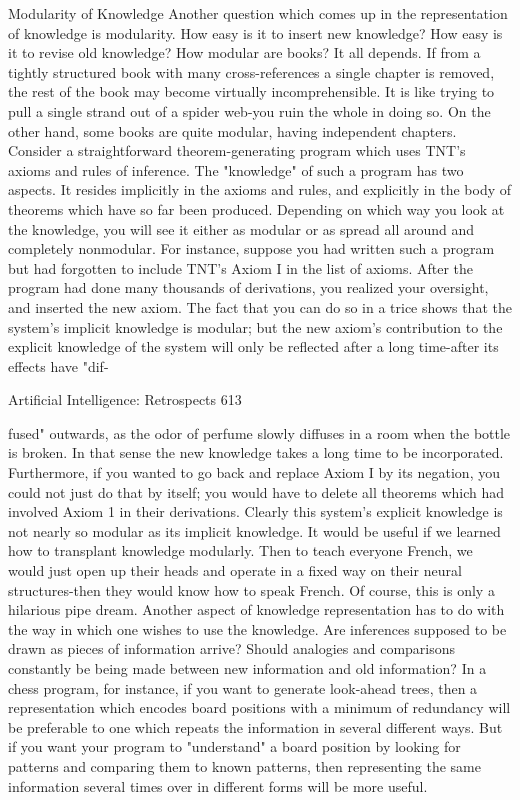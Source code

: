{                              Modularity of Knowledge
Another question which comes up in the representation of knowledge is modularity. How
easy is it to insert new knowledge? How easy is it to revise old knowledge? How modular
are books? It all depends. If from a tightly structured book with many cross-references a
single chapter is removed, the rest of the book may become virtually incomprehensible. It
is like trying to pull a single strand out of a spider web-you ruin the whole in doing so.
On the other hand, some books are quite modular, having independent chapters.
         Consider a straightforward theorem-generating program which uses TNT's
axioms and rules of inference. The "knowledge" of such a program has two aspects. It
resides implicitly in the axioms and rules, and explicitly in the body of theorems which
have so far been produced. Depending on which way you look at the knowledge, you will
see it either as modular or as spread all around and completely nonmodular. For instance,
suppose you had written such a program but had forgotten to include TNT's Axiom I in
the list of axioms. After the program had done many thousands of derivations, you
realized your oversight, and inserted the new axiom. The fact that you can do so in a trice
shows that the system's implicit knowledge is modular; but the new axiom's contribution
to the explicit knowledge of the system will only be reflected after a long time-after its
effects have "dif-




Artificial Intelligence: Retrospects                                                      613

fused" outwards, as the odor of perfume slowly diffuses in a room when the bottle is
broken. In that sense the new knowledge takes a long time to be incorporated.
Furthermore, if you wanted to go back and replace Axiom I by its negation, you could not
just do that by itself; you would have to delete all theorems which had involved Axiom 1
in their derivations. Clearly this system's explicit knowledge is not nearly so modular as
its implicit knowledge.
        It would be useful if we learned how to transplant knowledge modularly. Then to
teach everyone French, we would just open up their heads and operate in a fixed way on
their neural structures-then they would know how to speak French. Of course, this is only
a hilarious pipe dream.
        Another aspect of knowledge representation has to do with the way in which one
wishes to use the knowledge. Are inferences supposed to be drawn as pieces of
information arrive? Should analogies and comparisons constantly be being made between
new information and old information? In a chess program, for instance, if you want to
generate look-ahead trees, then a representation which encodes board positions with a
minimum of redundancy will be preferable to one which repeats the information in
several different ways. But if you want your program to "understand" a board position by
looking for patterns and comparing them to known patterns, then representing the same
information several times over in different forms will be more useful.

}
